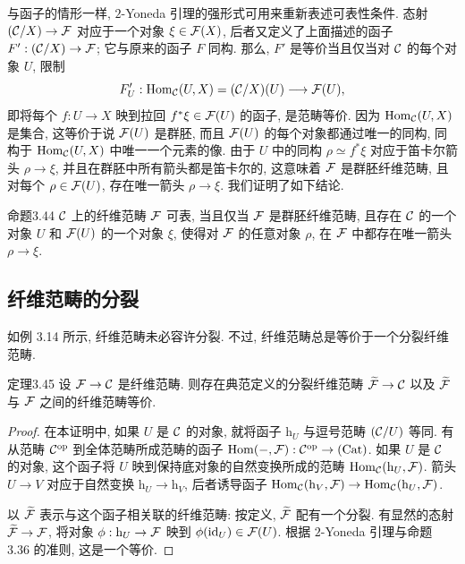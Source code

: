 与函子的情形一样, $2$-Yoneda 引理的强形式可用来重新表述可表性条件. 态射 $(\mathcal C/X)\to\mathcal F$ 对应于一个对象 $\xi\in\mathcal F(X)$, 后者又定义了上面描述的函子 $F':(\mathcal C/X)\to\mathcal F$; 它与原来的函子 $F$ 同构. 那么, $F'$ 是等价当且仅当对 $\mathcal C$ 的每个对象 $U$, 限制
\[
F'_U:\operatorname{Hom}_{\mathcal C}(U,X)=(\mathcal C/X)(U)\longrightarrow\mathcal F(U),
\]
即将每个 $f:U\to X$ 映到拉回 $f^*\xi\in\mathcal F(U)$ 的函子, 是范畴等价. 因为 $\operatorname{Hom}_{\mathcal C}(U,X)$ 是集合, 这等价于说 $\mathcal F(U)$ 是群胚, 而且 $\mathcal F(U)$ 的每个对象都通过唯一的同构, 同构于 $\operatorname{Hom}_{\mathcal C}(U,X)$ 中唯一一个元素的像. 由于 $U$ 中的同构 $\rho\simeq f^*\xi$ 对应于笛卡尔箭头 $\rho\to\xi$, 并且在群胚中所有箭头都是笛卡尔的, 这意味着 $\mathcal F$ 是群胚纤维范畴, 且对每个 $\rho\in\mathcal F(U)$, 存在唯一箭头 $\rho\to\xi$. 我们证明了如下结论.

\begin{origstatement}{命题}{3.44}\label{ch03:prop344}
$\mathcal C$ 上的纤维范畴 $\mathcal F$ 可表, 当且仅当 $\mathcal F$ 是群胚纤维范畴, 且存在 $\mathcal C$ 的一个对象 $U$ 和 $\mathcal F(U)$ 的一个对象 $\xi$, 使得对 $\mathcal F$ 的任意对象 $\rho$, 在 $\mathcal F$ 中都存在唯一箭头 $\rho\to\xi$.
\end{origstatement}

\subsection{纤维范畴的分裂}
如例 3.14 所示, 纤维范畴未必容许分裂. 不过, 纤维范畴总是等价于一个分裂纤维范畴.

\begin{origstatement}{定理}{3.45}\label{ch03:thm345}
设 $\mathcal F\to\mathcal C$ 是纤维范畴. 则存在典范定义的分裂纤维范畴 $\widetilde{\mathcal F}\to\mathcal C$ 以及 $\widetilde{\mathcal F}$ 与 $\mathcal F$ 之间的纤维范畴等价.
\end{origstatement}
\begin{proof}
在本证明中, 如果 $U$ 是 $\mathcal C$ 的对象, 就将函子 $\mathrm h_U$ 与逗号范畴 $(\mathcal C/U)$ 等同. 有从范畴 $\mathcal C^{\mathrm{op}}$ 到全体范畴所成范畴的函子 $\operatorname{Hom}(-,\mathcal F):\mathcal C^{\mathrm{op}}\to(\mathrm{Cat})$. 如果 $U$ 是 $\mathcal C$ 的对象, 这个函子将 $U$ 映到保持底对象的自然变换所成的范畴 $\operatorname{Hom}_{\mathcal C}(\mathrm h_U,\mathcal F)$. 箭头 $U\to V$ 对应于自然变换 $\mathrm h_U\to\mathrm h_V$, 后者诱导函子 $\operatorname{Hom}_{\mathcal C}(\mathrm h_V,\mathcal F)\to\operatorname{Hom}_{\mathcal C}(\mathrm h_U,\mathcal F)$.

以 $\widetilde{\mathcal F}$ 表示与这个函子相关联的纤维范畴: 按定义, $\widetilde{\mathcal F}$ 配有一个分裂. 有显然的态射 $\widetilde{\mathcal F}\to\mathcal F$, 将对象 $\phi:\mathrm h_U\to\mathcal F$ 映到 $\phi(\mathrm{id}_U)\in\mathcal F(U)$. 根据 $2$-Yoneda 引理与命题 3.36 的准则, 这是一个等价.
\end{proof}


